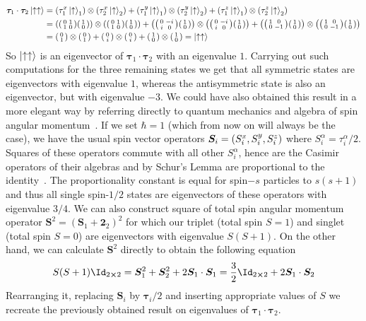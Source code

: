 \begin{align*}
    \bm{\tau}_1 \cdot \bm{\tau}_2 \ket{\ua\ua} &= 
    \left(\tau_1^x \ket{\ua}_1\right) \otimes \left(\tau^x_2 \ket{\ua}_2\right) + 
    \left(\tau_1^y \ket{\ua}_1\right) \otimes \left(\tau^y_2 \ket{\ua}_2\right) +
    \left(\tau_1^z \ket{\ua}_1\right) \otimes \left(\tau^z_2 \ket{\ua}_2\right)\nonumber\\
    &= \left( \smqty(\pmat{1}) \smqty(1\\0)\right) \otimes \left( \smqty(\pmat{1}) \smqty(1\\0)\right) +
    \left( \smqty(\pmat{2}) \smqty(1\\0)\right) \otimes \left( \smqty(\pmat{2}) \smqty(1\\0)\right)+
    \left( \smqty(\pmat{3}) \smqty(1\\0)\right) \otimes \left( \smqty(\pmat{3}) \smqty(1\\0)\right)\\
    &= \smqty(0\\1) \otimes \smqty(0\\1) + \smqty(0\\i) \otimes \smqty(0\\i) + 
    \smqty(1\\0) \otimes \smqty(1\\0) = \ket{\ua\ua}
\end{align*}
So \(\ket{\uparrow\uparrow}\) is an eigenvector of \(\bm{\tau}_1 \cdot \bm{\tau}_2\) with
an eigenvalue \(1\). Carrying out such computations for the three remaining states we get
that all symmetric states are eigenvectors with eigenvalue \(1\), whereas the
antisymmetric state is also an eigenvector, but with eigenvalue \(-3\). 
We could have also obtained this result in a more elegant way by referring directly
to quantum mechanics and algebra of spin angular momentum~\autocite{Sakurai2017}.
If we set \(\hbar = 1\) (which from now on will always be the case), we have the usual
spin vector operators \(\bm{S}_i = \left(S^{x}_i,S^{y}_i, S^{z}_i\right) \) where
 \(S_i^{\alpha} = \tau_i^{\alpha}/2\).
Squares of these operators commute with all other \(S_i^{\alpha}\), hence are the
Casimir operators of their algebras and by Schur's Lemma are proportional to
the identity~\autocite{Woit2017}.
The proportionality constant is equal for spin\(-s\) particles to \(s(s+1)\) and thus
all single spin-\(1/2\) states are eigenvectors of these operators with eigenvalue \(3/4\). 
We can also construct square of total spin angular momentum operator
\(\bm{S}^2 = (\bm{S}_1 + \bm{2}_2)^2\) for which our triplet (total spin \(S=1\)) and singlet
(total spin \(S=0\)) are eigenvectors with eigenvalue \(S(S+1)\). On the other hand, we 
can calculate \(\bm{S}^2\) directly to obtain the following equation
\begin{equation}
    S(S+1)\Id_{2\cross 2} = \bm{S}_1^2 + \bm{S}_2^2 + 2\bm{S}_1\cdot \bm{S}_1 = \frac{3}{2}\Id_{2\cross 2} + 2\bm{S}_1\cdot\bm{S}_2
\end{equation} 
Rearranging it, replacing \(\bm{S}_i\) by \(\bm{\tau}_i/2\) and inserting appropriate values
of \(S\) we recreate the previously obtained result on eigenvalues of 
\(\bm{\tau}_1\cdot\bm{\tau}_2\).

